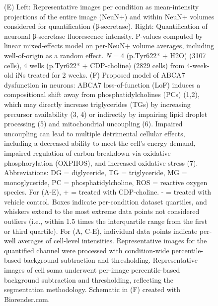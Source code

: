 \begin{figure}[ht]
{        (E) Left: Representative images per condition as mean-intensity projections of the entire image (NeuN+) and within NeuN+ volumes considered for quantification (β-secretase). Right: Quantification of neuronal β-secretase fluorescence intensity. P-values computed by linear mixed-effects model on per-NeuN+ volume averages, including well-of-origin as a random effect. $N = 4$ (p.Tyr622* + H2O) (3107 cells), 4 wells (p.Tyr622* + CDP-choline) (2829 cells) from 4-week-old iNs treated for 2 weeks. 
        (F) Proposed model of ABCA7 dysfunction in neurons: ABCA7 loss-of-function (LoF) induces a compositional shift away from phosphatidylcholines (PCs) (1,2), which may directly increase triglycerides (TGs) by increasing precursor availability (3, 4) or indirectly by impairing lipid droplet processing (5) and mitochondrial uncoupling (6). Impaired uncoupling can lead to multiple detrimental cellular effects, including a decreased ability to meet the cell’s energy demand, impaired regulation of carbon breakdown via oxidative phosphorylation (OXPHOS), and increased oxidative stress (7). Abbreviations: DG = diglyceride, TG = triglyceride, MG = monoglyceride, PC = phosphatidylcholine, ROS = reactive oxygen species. For (A-E),  + = treated with CDP-choline. - = treated with vehicle control. Boxes indicate per-condition dataset quartiles, and whiskers extend to the most extreme data points not considered outliers (i.e., within 1.5 times the interquartile range from the first or third quartile). For (A, C-E), individual data points indicate per-well averages of cell-level intensities. Representative images for the quantified channel were processed with condition-wide percentile-based background subtraction and thresholding. Representative images of cell soma underwent per-image percentile-based background subtraction and thresholding, reflecting the segmentation methodology. Schematic in (F) created with Biorender.com.
    }
    \label{fig:main_choline}
\end{figure}